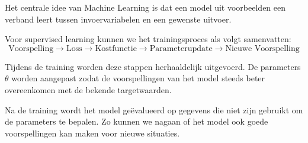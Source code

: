 \documentclass{ximera}
\begin{document}
\begin{conclusion} \textbf{ }

Het centrale idee van Machine Learning is dat een model uit voorbeelden een
verband leert tussen invoervariabelen en een gewenste uitvoer. 

Voor supervised learning kunnen we het trainingsproces als volgt samenvatten:
\[
\boxed{
\text{Voorspelling}
\rightarrow
\text{Loss}
\rightarrow
\text{Kostfunctie}
\rightarrow
\text{Parameterupdate}
\rightarrow
\text{Nieuwe Voorspelling}
}
\]

Tijdens de training worden deze stappen herhaaldelijk uitgevoerd. De parameters $\theta$ worden aangepast zodat de voorspellingen van het model steeds beter overeenkomen met de bekende targetwaarden.

Na de training wordt het model geëvalueerd op gegevens die niet zijn gebruikt om de parameters te bepalen. Zo kunnen we nagaan of het model ook goede voorspellingen kan maken voor nieuwe situaties.
\end{conclusion}
\end{document}
